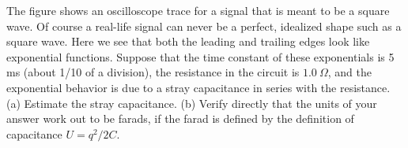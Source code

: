 The figure shows an oscilloscope trace for a signal that is meant to
be a square wave. Of course a real-life signal can never be a perfect,
idealized shape such as a square wave. Here we see that both the
leading and trailing edges look like exponential functions.
Suppose that the time constant of these exponentials is 5 ms
(about 1/10 of a division), the resistance in the circuit is
$1.0\ \Omega$, and the exponential behavior is due to a
stray capacitance in series with the resistance.\\
(a) Estimate the stray capacitance.\answercheck\hwendpart
(b) Verify directly that the units of your answer work out to be
farads, if the farad is defined by the definition of capacitance
$U=q^2/2C$.



